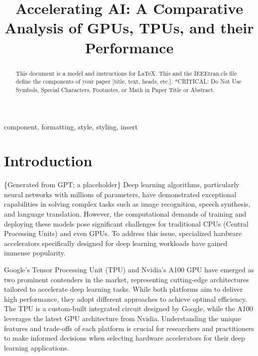 \documentclass[conference]{IEEEtran}
\begin{document}
    \title{Accelerating AI: A Comparative Analysis of GPUs, TPUs, and their Performance}

    \author{
    }

    \maketitle

    \begin{abstract}
        This document is a model and instructions for \LaTeX.
        This and the IEEEtran.cls file define the components of your paper [title, text, heads, etc.].
        *CRITICAL: Do Not Use Symbols, Special Characters, Footnotes,
        or Math in Paper Title or Abstract.
    \end{abstract}

    \begin{IEEEkeywords}
        component, formatting, style, styling, insert
    \end{IEEEkeywords}


    \section{Introduction}

    \{Generated from GPT; a placeholder\}
    Deep learning algorithms, particularly neural networks with millions of parameters, have demonstrated exceptional capabilities in solving complex tasks such as image recognition, speech synthesis, and language translation.
    However, the computational demands of training and deploying these models pose significant challenges for traditional CPUs (Central Processing Units) and even GPUs.
    To address this issue, specialized hardware accelerators specifically designed for deep learning workloads have gained immense popularity.

    Google's Tensor Processing Unit (TPU) and Nvidia's A100 GPU have emerged as two prominent contenders in the market, representing cutting-edge architectures tailored to accelerate deep learning tasks.
    While both platforms aim to deliver high performance, they adopt different approaches to achieve optimal efficiency.
    The TPU is a custom-built integrated circuit designed by Google, while the A100 leverages the latest GPU architecture from Nvidia.
    Understanding the unique features and trade-offs of each platform is crucial for researchers and practitioners to make informed decisions when selecting hardware accelerators for their deep learning applications.
\end{document}

